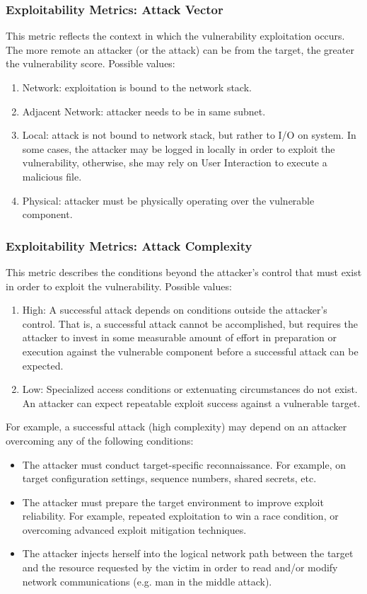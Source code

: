 \documentclass[a4paper, 10pt, titlepage]{article}
\begin{document}
\subsubsection*{Exploitability Metrics: Attack Vector}
This metric reflects the context in which the vulnerability exploitation occurs. The more remote an attacker (or the attack) can be from the target, the greater the vulnerability score. Possible values:
\begin{enumerate}
	\item Network: exploitation is bound to the network stack.
	\item Adjacent Network: attacker needs to be in same subnet.
	\item Local: attack is not bound to network stack, but rather to I/O on system. In some cases, the attacker may be logged in locally in order to exploit the vulnerability, otherwise, she may rely on User Interaction to execute a malicious file.
	\item Physical: attacker must be physically operating over the vulnerable component.
\end{enumerate}

\subsubsection*{Exploitability Metrics: Attack Complexity}
This metric describes the conditions beyond the attacker’s control that must exist in order to exploit the vulnerability. Possible values:
\begin{enumerate}
	\item High: A successful attack depends on conditions outside the attacker's control. That is, a successful attack cannot be accomplished, but requires the attacker to invest in some measurable amount of effort in preparation or execution against the vulnerable component before a successful attack can be expected.
	\item Low: Specialized access conditions or extenuating circumstances do not exist. An attacker can expect repeatable exploit success against a vulnerable target.
\end{enumerate}
For example, a successful attack (high complexity) may depend on an attacker overcoming any of the following conditions:
\begin{itemize}
	\item The attacker must conduct target-specific reconnaissance. For example, on target configuration settings, sequence numbers, shared secrets, etc.
	\item The attacker must prepare the target environment to improve exploit reliability. For example, repeated exploitation to win a race condition, or overcoming advanced exploit mitigation techniques.
	\item The attacker injects herself into the logical network path between the target and the resource requested by the victim in order to read and/or modify network communications (e.g. man in the middle attack).
\end{itemize}
\end{document}
